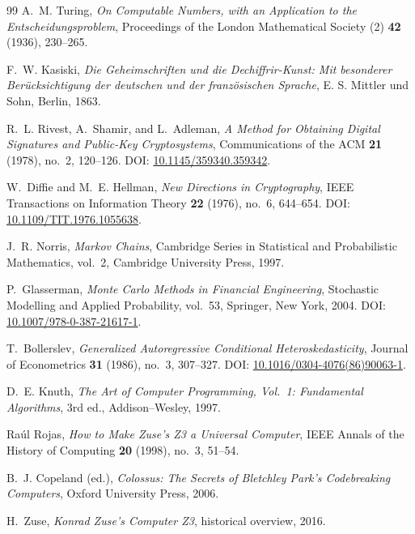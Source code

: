 \documentclass[12pt,a4paper]{article}
\begin{document}
\begin{thebibliography}{99}
A.~M. Turing,
\emph{On Computable Numbers, with an Application to the Entscheidungsproblem},
Proceedings of the London Mathematical Society (2) \textbf{42} (1936), 230--265.

F.~W. Kasiski,
\emph{Die Geheimschriften und die Dechiffrir-Kunst: Mit besonderer Ber\"ucksichtigung der deutschen und der franz\"osischen Sprache},
E. S. Mittler und Sohn, Berlin, 1863.

R.~L. Rivest, A.~Shamir, and L.~Adleman,
\emph{A Method for Obtaining Digital Signatures and Public-Key Cryptosystems},
Communications of the ACM \textbf{21} (1978), no.~2, 120--126.
\newblock DOI: \href{https://doi.org/10.1145/359340.359342}{10.1145/359340.359342}.

W.~Diffie and M.~E. Hellman,
\emph{New Directions in Cryptography},
IEEE Transactions on Information Theory \textbf{22} (1976), no.~6, 644--654.
\newblock DOI: \href{https://doi.org/10.1109/TIT.1976.1055638}{10.1109/TIT.1976.1055638}.

J.~R. Norris,
\emph{Markov Chains},
Cambridge Series in Statistical and Probabilistic Mathematics, vol.~2,
Cambridge University Press, 1997.

P.~Glasserman,
\emph{Monte Carlo Methods in Financial Engineering},
Stochastic Modelling and Applied Probability, vol.~53,
Springer, New York, 2004.
\newblock DOI: \href{https://doi.org/10.1007/978-0-387-21617-1}{10.1007/978-0-387-21617-1}.

T.~Bollerslev,
\emph{Generalized Autoregressive Conditional Heteroskedasticity},
Journal of Econometrics \textbf{31} (1986), no.~3, 307--327.
\newblock DOI: \href{https://doi.org/10.1016/0304-4076(86)90063-1}{10.1016/0304-4076(86)90063-1}.

D.~E. Knuth,
\emph{The Art of Computer Programming, Vol.~1: Fundamental Algorithms},
3rd ed., Addison--Wesley, 1997.

Ra\'ul Rojas,
\emph{How to Make Zuse's Z3 a Universal Computer},
IEEE Annals of the History of Computing \textbf{20} (1998), no.~3, 51--54.

B.~J. Copeland (ed.),
\emph{Colossus: The Secrets of Bletchley Park's Codebreaking Computers},
Oxford University Press, 2006.

H.~Zuse,
\emph{Konrad Zuse's Computer Z3},
historical overview, 2016.


\end{thebibliography}
\end{document}
